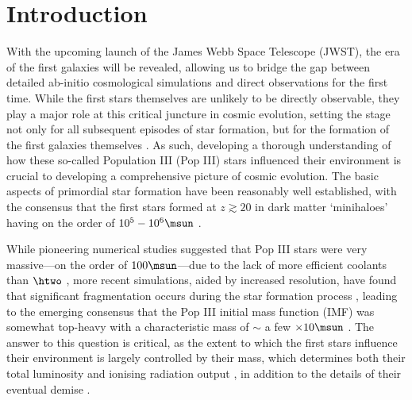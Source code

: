 \section{Introduction}
\label{intro}

With the upcoming launch of the James Webb Space Telescope (JWST), the era of the first galaxies will be revealed, allowing us to bridge the gap between detailed ab-initio cosmological simulations and direct observations for the first time. While the first stars themselves are unlikely to be directly observable, they play a major role at this critical juncture in cosmic evolution, setting the stage not only for all subsequent episodes of star formation, but for the formation of the first galaxies themselves \citep{BarkanaLoeb2001,Miralda-Escude2003,Brommetal2009,Loeb2010, Bromm2013}.  As such, developing a thorough understanding of how these so-called Population III (Pop III) stars influenced their environment is crucial to developing a comprehensive picture of cosmic evolution. The basic aspects of primordial star formation have been reasonably well established, with the consensus that the first stars formed at $z\gtrsim20$ in dark matter `minihaloes' having on the order of $10^5 - 10^6\msun$ \citep{CouchmanRees1986, HaimanThoulLoeb1996, Tegmarketal1997}. 

While pioneering numerical studies suggested that Pop III stars were very massive---on the order of $100\msun$---due to the lack of more efficient coolants than $\htwo$ \citep[e.g.,][]{BrommCoppiLarson1999, BrommCoppiLarson2002, AbelBryanNorman2002, Yoshidaetal2003, BrommLarson2004, Yoshidaetal2006, O'SheaNorman2007}, more recent simulations, aided by increased resolution, have found that significant fragmentation occurs during the star formation process \citep{StacyGreifBromm2010, Clarketal2011a, Clarketal2011b, Greifetal2011, Greifetal2012, StacyBromm2013, Hiranoetal2014}, leading to the emerging consensus that the Pop III initial mass function (IMF) was somewhat top-heavy with a characteristic mass of $\sim$ a few $\times 10\msun$ \citep{Bromm2013}.  The answer to this question is critical, as the extent to which the first stars influence their environment is largely controlled by their mass, which determines both their total luminosity and ionising radiation output \citep{Schaerer2002}, in addition to the details of their eventual demise \citep{Hegeretal2003, HegerWoosley2010, MaederMeynet2012}.

